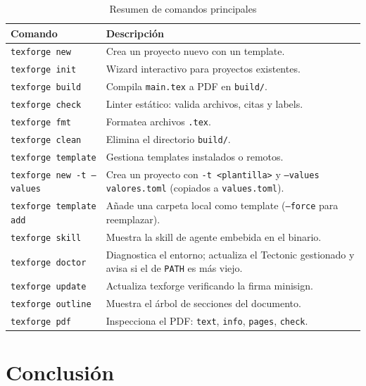 \documentclass[a4paper,12pt]{article}
\begin{document}
  \begin{table}[H]
    \centering
    \caption{Resumen de comandos principales}
    \label{tab:comandos}
    \begin{tabular}{@{}lp{8cm}@{}}
      \toprule
      \textbf{Comando} & \textbf{Descripción} \\
      \midrule
      \texttt{texforge new}    & Crea un proyecto nuevo con un template. \\
      \texttt{texforge init}   & Wizard interactivo para proyectos existentes. \\
      \texttt{texforge build}  & Compila \texttt{main.tex} a PDF en \texttt{build/}. \\
      \texttt{texforge check}  & Linter estático: valida archivos, citas y labels. \\
      \texttt{texforge fmt}    & Formatea archivos \texttt{.tex}. \\
      \texttt{texforge clean}  & Elimina el directorio \texttt{build/}. \\
      \texttt{texforge template} & Gestiona templates instalados o remotos. \\
      \texttt{texforge new -t --values} & Crea un proyecto con \texttt{-t <plantilla>} y \texttt{--values valores.toml} (copiados a \texttt{values.toml}). \\
      \texttt{texforge template add} & Añade una carpeta local como template (\texttt{--force} para reemplazar). \\
      \texttt{texforge skill} & Muestra la skill de agente embebida en el binario. \\
      \texttt{texforge doctor} & Diagnostica el entorno; actualiza el Tectonic gestionado y avisa si el de \texttt{PATH} es más viejo. \\
      \texttt{texforge update} & Actualiza texforge verificando la firma minisign. \\
      \texttt{texforge outline} & Muestra el árbol de secciones del documento. \\
      \texttt{texforge pdf} & Inspecciona el PDF: \texttt{text}, \texttt{info}, \texttt{pages}, \texttt{check}. \\
      \bottomrule
    \end{tabular}
  \end{table}

  \section{Conclusión}\label{sec:conclusion}
\end{document}
